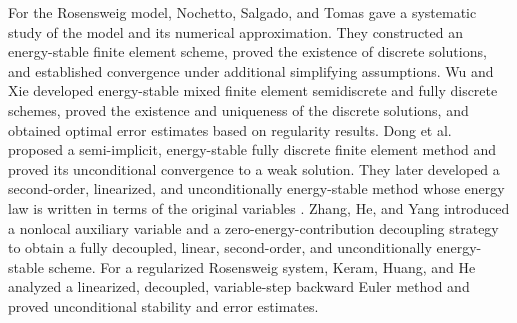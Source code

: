 \documentclass[11pt,a4paper]{article}
\theoremstyle{definition}
\numberwithin{equation}{section}
\begin{document}
For the Rosensweig model, Nochetto, Salgado, and Tomas \cite{NochettoSalgadoTomas2016} gave a systematic study of the model and its numerical approximation. They constructed an energy-stable finite element scheme, proved the existence of discrete solutions, and established convergence under additional simplifying assumptions. Wu and Xie \cite{WuXie2025} developed energy-stable mixed finite element semidiscrete and fully discrete schemes, proved the existence and uniqueness of the discrete solutions, and obtained optimal error estimates based on regularity results. Dong et al.\ \cite{DongHuangHuangTang2025} proposed a semi-implicit, energy-stable fully discrete finite element method and proved its unconditional convergence to a weak solution. They later developed a second-order, linearized, and unconditionally energy-stable method whose energy law is written in terms of the original variables \cite{DongHuangHuangYang2026}. Zhang, He, and Yang \cite{ZhangHeYang2025} introduced a nonlocal auxiliary variable and a zero-energy-contribution decoupling strategy to obtain a fully decoupled, linear, second-order, and unconditionally energy-stable scheme. For a regularized Rosensweig system, Keram, Huang, and He \cite{KeramRosensweig2026} analyzed a linearized, decoupled, variable-step backward Euler method and proved unconditional stability and error estimates.
\end{document}
